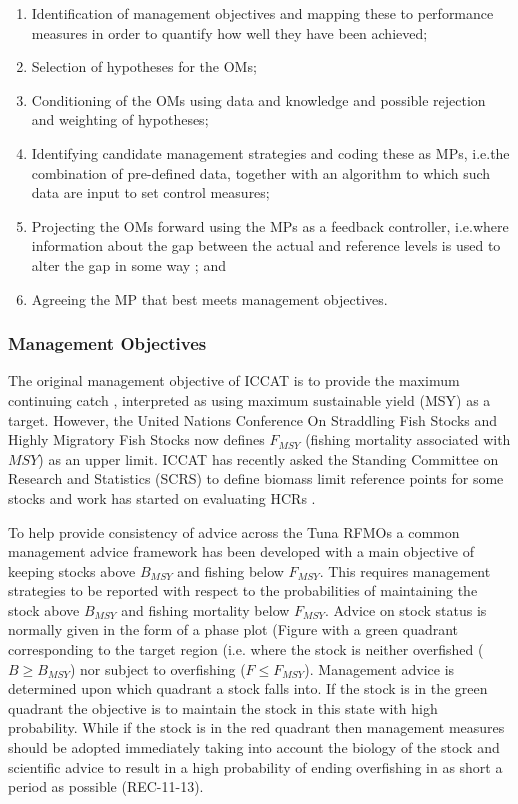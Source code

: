 \documentclass[%
nonumbib,      %
%
]{nrc1}                          %
\begin{document}
\begin{enumerate}
 \item Identification of management objectives and mapping these to performance measures in order to quantify how well they have been achieved;
 \item Selection of hypotheses for the OMs;
 \item Conditioning of the OMs using data and knowledge and possible rejection and weighting of hypotheses;
 \item Identifying candidate management strategies and coding these as MPs, i.e.the combination of pre-defined data, together with an algorithm to which such data are input to set control measures;
 \item Projecting the OMs forward using the MPs as a feedback controller, i.e.where information about the gap between the actual and reference levels is used to alter the gap in some way \citep{ramaprasad1983definition}; and
 \item Agreeing the MP that best meets management objectives.
\end{enumerate}

\subsubsection*{Management Objectives} 

The original management objective of ICCAT is to provide the maximum continuing catch \citep{iccat2007basictext}, interpreted as using maximum sustainable yield (MSY) as a target. However, the United Nations Conference On Straddling Fish Stocks and Highly Migratory Fish Stocks \cite[UNFSA][]{un1995straddling} now defines $F_{MSY}$ (fishing mortality  associated  with $MSY$) as an upper limit. ICCAT has recently asked the Standing Committee on Research and Statistics (SCRS) to define  biomass limit reference points for some stocks and work has started on evaluating HCRs \citep{iccat2007swgsm}.

To help provide consistency of advice across the Tuna RFMOs a common management advice framework \cite[i.e. the Kobe Framework ][]{de2012precautionary} has been developed with a main objective of keeping stocks above $B_{MSY}$ and fishing below $F_{MSY}$. This requires management strategies to be reported with respect to the probabilities of maintaining the stock above $B_{MSY}$ and fishing mortality below $F_{MSY}$. Advice on stock status is normally given in the form of a phase plot (Figure %
with a green quadrant corresponding to the  target region (i.e. where the stock is neither overfished ($B \geq B_{MSY}$) nor subject to overfishing ($F \leq F_{MSY}$).
Management advice is determined upon which quadrant a stock falls into. If the stock is in the green quadrant the objective is to maintain the stock in this state with high probability. While if the stock is in the red quadrant then management measures should be adopted immediately taking into account the biology of the stock and scientific advice to result in a high probability of ending overfishing in as short a period as possible (REC-11-13).
\end{document}
